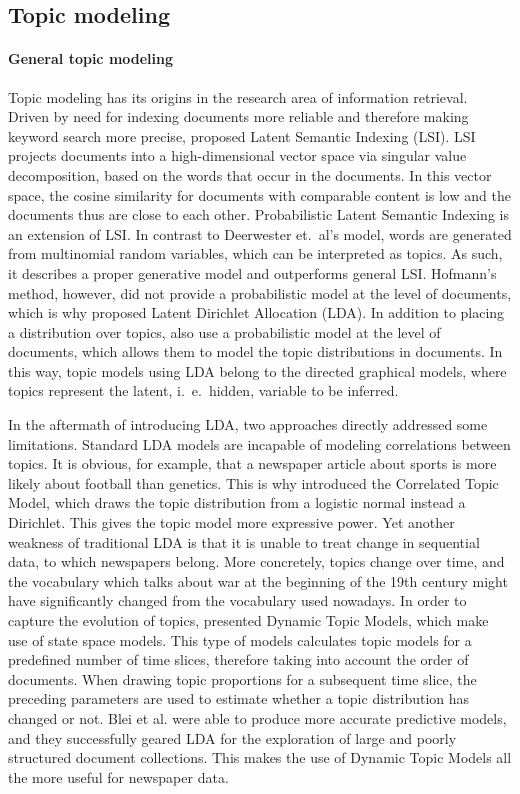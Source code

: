 \subsection{Topic modeling}
\paragraph{General topic modeling}Topic modeling has its origins in the research area of information retrieval. Driven by need for indexing documents more reliable and therefore making keyword search more precise, \citet{deerwesterscottindexing1990} proposed Latent Semantic Indexing (LSI). LSI projects documents into a high-dimensional vector space via singular value decomposition, based on the words that occur in the documents. In this vector space, the cosine similarity for documents with comparable content is low and the documents thus are close to each other. Probabilistic Latent Semantic Indexing \citep{hofmannprobabilistic1999} is an extension of LSI. In contrast to Deerwester et.~al's model, words are generated from multinomial random variables, which can be interpreted as topics. As such, it describes a proper generative model and outperforms general LSI. Hofmann's method, however, did not provide a probabilistic model at the level of documents, which is why  \citet{bleilatent2003} proposed Latent Dirichlet Allocation (LDA). In addition to placing a distribution over topics, \citet{bleilatent2003} also use a probabilistic model at the level of documents, which allows them to model the topic distributions in documents. In this way, topic models using LDA belong to the directed graphical models, where topics represent the latent, i.~e.~hidden, variable to be inferred.

In the aftermath of introducing LDA, two approaches directly addressed some limitations. Standard LDA models are incapable of modeling correlations between topics. It is obvious, for example, that a newspaper article about sports is more likely about football than genetics. This is why \citet{Blei:2005:CTM:2976248.2976267} introduced the Correlated Topic Model, which draws the topic distribution from a logistic normal instead a Dirichlet. This gives the topic model more expressive power. Yet another weakness of traditional LDA is that it is unable to treat change in sequential data, to which newspapers belong. More concretely, topics change over time, and the vocabulary which talks about war at the beginning of the 19th century might have significantly changed from the vocabulary used nowadays. In order to capture the evolution of topics, \citet{bleidynamic2006} presented Dynamic Topic Models, which make use of state space models. This type of models calculates topic models for a predefined number of time slices, therefore taking into account the order of documents. When drawing topic proportions for a subsequent time slice, the preceding parameters are used to estimate whether a topic distribution has changed or not. Blei et al. were able to produce more accurate predictive models, and they successfully geared LDA for the exploration of large and poorly structured document collections. This makes the use of Dynamic Topic Models all the more useful for newspaper data. 

